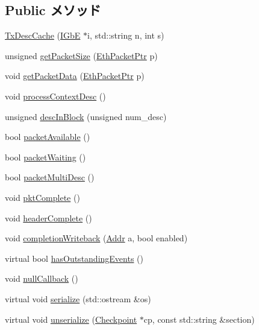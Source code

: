 \subsection*{Public メソッド}
\begin{DoxyCompactItemize}
\item 
\hyperlink{classIGbE_1_1TxDescCache_a5c53fad45a69d0f3c20bd08b980a2485}{TxDescCache} (\hyperlink{classIGbE}{IGbE} $\ast$i, std::string n, int s)
\item 
unsigned \hyperlink{classIGbE_1_1TxDescCache_a924187a1c689184efd8492916ca12e32}{getPacketSize} (\hyperlink{classRefCountingPtr}{EthPacketPtr} p)
\item 
void \hyperlink{classIGbE_1_1TxDescCache_af58491ad4f774a610584c404231b30ae}{getPacketData} (\hyperlink{classRefCountingPtr}{EthPacketPtr} p)
\item 
void \hyperlink{classIGbE_1_1TxDescCache_af7a2e6e84647ba93598a7a02730cba41}{processContextDesc} ()
\item 
unsigned \hyperlink{classIGbE_1_1TxDescCache_a6fb0bd6d34eae6de55fb211662f92180}{descInBlock} (unsigned num\_\-desc)
\item 
bool \hyperlink{classIGbE_1_1TxDescCache_a3fd3cdfc66306ff22b53325aeb4e2c64}{packetAvailable} ()
\item 
bool \hyperlink{classIGbE_1_1TxDescCache_ad8a4f7d1ef74ba318f35597c58bc757b}{packetWaiting} ()
\item 
bool \hyperlink{classIGbE_1_1TxDescCache_a126e4d9db081d9783bdcf86befdff3de}{packetMultiDesc} ()
\item 
void \hyperlink{classIGbE_1_1TxDescCache_a4f0881be8aa8698e16dcf52a89085100}{pktComplete} ()
\item 
void \hyperlink{classIGbE_1_1TxDescCache_ae7e4853724fee8019b3bdd04200b9d6b}{headerComplete} ()
\item 
void \hyperlink{classIGbE_1_1TxDescCache_a10c4245eaf8149b42c17bb6aa4a7c5eb}{completionWriteback} (\hyperlink{base_2types_8hh_af1bb03d6a4ee096394a6749f0a169232}{Addr} a, bool enabled)
\item 
virtual bool \hyperlink{classIGbE_1_1TxDescCache_a2587421ae644a9474416e5a5b63ccbca}{hasOutstandingEvents} ()
\item 
void \hyperlink{classIGbE_1_1TxDescCache_a34032325b571ff60682217adbf73ad37}{nullCallback} ()
\item 
virtual void \hyperlink{classIGbE_1_1TxDescCache_a53e036786d17361be4c7320d39c99b84}{serialize} (std::ostream \&os)
\item 
virtual void \hyperlink{classIGbE_1_1TxDescCache_af22e5d6d660b97db37003ac61ac4ee49}{unserialize} (\hyperlink{classCheckpoint}{Checkpoint} $\ast$cp, const std::string \&section)
\end{DoxyCompactItemize}
